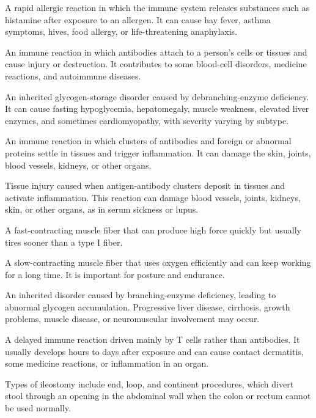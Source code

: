  A rapid allergic reaction in which the immune system releases substances such as histamine after exposure to an allergen. It can cause hay fever, asthma symptoms, hives, food allergy, or life-threatening anaphylaxis.

 An immune reaction in which antibodies attach to a person’s cells or tissues and cause injury or destruction. It contributes to some blood-cell disorders, medicine reactions, and autoimmune diseases.

 An inherited glycogen-storage disorder caused by debranching-enzyme deficiency. It can cause fasting hypoglycemia, hepatomegaly, muscle weakness, elevated liver enzymes, and sometimes cardiomyopathy, with severity varying by subtype.

 An immune reaction in which clusters of antibodies and foreign or abnormal proteins settle in tissues and trigger inflammation. It can damage the skin, joints, blood vessels, kidneys, or other organs.

 Tissue injury caused when antigen-antibody clusters deposit in tissues and activate inflammation. This reaction can damage blood vessels, joints, kidneys, skin, or other organs, as in serum sickness or lupus.

 A fast-contracting muscle fiber that can produce high force quickly but usually tires sooner than a type I fiber.

 A slow-contracting muscle fiber that uses oxygen efficiently and can keep working for a long time. It is important for posture and endurance.

 An inherited disorder caused by branching-enzyme deficiency, leading to abnormal glycogen accumulation. Progressive liver disease, cirrhosis, growth problems, muscle disease, or neuromuscular involvement may occur.

 A delayed immune reaction driven mainly by T cells rather than antibodies. It usually develops hours to days after exposure and can cause contact dermatitis, some medicine reactions, or inflammation in an organ.

 Types of ileostomy include end, loop, and continent procedures, which divert stool through an opening in the abdominal wall when the colon or rectum cannot be used normally.

